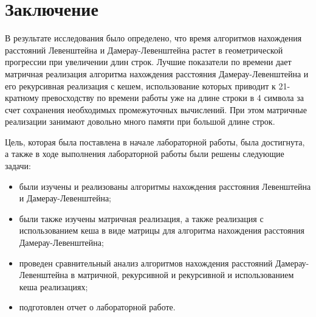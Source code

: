 \chapter*{Заключение}

В результате исследования было определено, что время алгоритмов нахождения расстояний Левенштейна и Дамерау-Левенштейна растет в геометрической прогрессии при увеличении длин строк. Лучшие показатели по времени дает матричная реализация алгоритма нахождения расстояния Дамерау-Левенштейна и его рекурсивная реализация с кешем, использование которых приводит к 21-кратному превосходству по времени работы уже на длине строки в 4 символа за счет сохранения необходимых промежуточных вычислений. При этом матричные реализации занимают довольно много памяти при большой длине строк. 


Цель, которая была поставлена в начале лабораторной работы, была достигнута, а также в ходе выполнения лабораторной работы были решены следующие задачи:

\begin{itemize}
	\item были изучены и реализованы алгоритмы нахождения расстояния Левенштейна и Дамерау-Левенштейна;
	\item были также изучены матричная реализация, а также реализация с использованием кеша в виде матрицы для алгоритма нахождения расстояния Дамерау-Левенштейна;
    \item проведен сравнительный анализ алгоритмов нахождения расстояний Дамерау-Левенштейна в матричной, рекурсивной и рекурсивной и использованием кеша реализациях;
	\item подготовлен отчет о лабораторной работе.
\end{itemize}